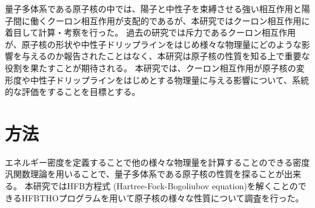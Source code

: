 \documentclass[12pt]{jarticle}
\begin{document}
量子多体系である原子核の中では、陽子と中性子を束縛させる強い相互作用と陽子間に働くクーロン相互作用が支配的であるが、本研究ではクーロン相互作用に着目して計算・考察を行った。
過去の研究では斥力であるクーロン相互作用が、原子核の形状や中性子ドリップラインをはじめ様々な物理量にどのような影響を与えるのか報告されたことはなく、本研究は原子核の性質を知る上で重要な役割を果たすことが期待される。
本研究では、クーロン相互作用が原子核の変形度や中性子ドリップラインをはじめとする物理量に与える影響について、系統的な評価をすることを目標とする。

\section{方法}
%
エネルギー密度を定義することで他の様々な物理量を計算することのできる密度汎関数理論を用いることで、量子多体系である原子核の性質を探ることが出来る。
本研究ではHFB方程式 (Hartree-Fock-Bogoliubov equation)を解くことのできるHFBTHOプログラムを用いて原子核の様々な性質について調査を行った。
\end{document}
